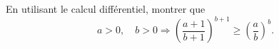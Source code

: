 En utilisant le calcul différentiel, montrer que
\[ a > 0,\quad b > 0 \Rightarrow \left(\frac{a + 1}{b + 1}\right)^{b+1} \geq \left(\frac{a}{b}\right)^b. \]
